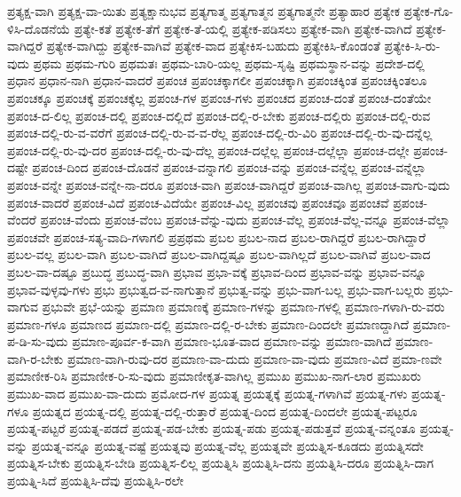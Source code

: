 {ಪ್ರತ್ಯಕ್ಷ-ವಾಗಿ
ಪ್ರತ್ಯಕ್ಷ-ವಾ-ಯಿತು
ಪ್ರತ್ಯಕ್ಷಾನುಭವ
ಪ್ರತ್ಯಗಾತ್ಮ
ಪ್ರತ್ಯಗಾತ್ಮನ
ಪ್ರತ್ಯಗಾತ್ಮನೇ
ಪ್ರತ್ಯಾಹಾರ
ಪ್ರತ್ಯೇಕ
ಪ್ರತ್ಯೇಕ-ಗೊ-ಳಿಸಿ-ದೊಡನೆಯೆ
ಪ್ರತ್ಯೇ-ಕತೆ
ಪ್ರತ್ಯೇಕ-ತೆಗೆ
ಪ್ರತ್ಯೇಕ-ತೆ-ಯಲ್ಲಿ
ಪ್ರತ್ಯೇಕ-ಪಡಿಸಲು
ಪ್ರತ್ಯೇಕ-ವಾಗಿ
ಪ್ರತ್ಯೇಕ-ವಾಗಿದೆ
ಪ್ರತ್ಯೇಕ-ವಾಗಿದ್ದರೆ
ಪ್ರತ್ಯೇಕ-ವಾಗಿದ್ದು
ಪ್ರತ್ಯೇಕ-ವಾಗಿವೆ
ಪ್ರತ್ಯೇಕ-ವಾದ
ಪ್ರತ್ಯೇಕಿಸ-ಬಹುದು
ಪ್ರತ್ಯೇಕಿಸಿ-ಕೊಂಡಂತೆ
ಪ್ರತ್ಯೇಕಿ-ಸಿ-ರು-ವುದು
ಪ್ರಥಮ
ಪ್ರಥಮ-ಗುರಿ
ಪ್ರಥಮತಃ
ಪ್ರಥಮ-ಬಾರಿ-ಯಲ್ಲ
ಪ್ರಥಮ-ಸೃಷ್ಟಿ
ಪ್ರಥಮಸ್ಥಾನ-ವನ್ನು
ಪ್ರದೇಶ-ದಲ್ಲಿ
ಪ್ರಧಾನ
ಪ್ರಧಾನ-ನಾಗಿ
ಪ್ರಧಾನ-ವಾದರೆ
ಪ್ರಪಂಚ
ಪ್ರಪಂಚಕ್ಕಾಗಲೀ
ಪ್ರಪಂಚಕ್ಕಾಗಿ
ಪ್ರಪಂಚಕ್ಕಿಂತ
ಪ್ರಪಂಚಕ್ಕಿಂತಲೂ
ಪ್ರಪಂಚಕ್ಕೂ
ಪ್ರಪಂಚಕ್ಕೆ
ಪ್ರಪಂಚಕ್ಕೆಲ್ಲ
ಪ್ರಪಂಚ-ಗಳ
ಪ್ರಪಂಚ-ಗಳು
ಪ್ರಪಂಚದ
ಪ್ರಪಂಚ-ದಂತೆ
ಪ್ರಪಂಚ-ದಂತೆಯೇ
ಪ್ರಪಂಚ-ದ-ಲಿಲ್ಲ
ಪ್ರಪಂಚ-ದಲ್ಲಿ
ಪ್ರಪಂಚ-ದಲ್ಲಿದೆ
ಪ್ರಪಂಚ-ದಲ್ಲಿ-ರ-ಬೇಕು
ಪ್ರಪಂಚ-ದಲ್ಲಿರು
ಪ್ರಪಂಚ-ದಲ್ಲಿ-ರುವ
ಪ್ರಪಂಚ-ದಲ್ಲಿ-ರು-ವ-ವರೆಗೆ
ಪ್ರಪಂಚ-ದಲ್ಲಿ-ರು-ವ-ವ-ರೆಲ್ಲ
ಪ್ರಪಂಚ-ದಲ್ಲಿ-ರು-ವಿರಿ
ಪ್ರಪಂಚ-ದಲ್ಲಿ-ರು-ವು-ದನ್ನೆಲ್ಲ
ಪ್ರಪಂಚ-ದಲ್ಲಿ-ರು-ವು-ದರ
ಪ್ರಪಂಚ-ದಲ್ಲಿ-ರು-ವು-ದೆಲ್ಲ
ಪ್ರಪಂಚ-ದಲ್ಲೆಲ್ಲ
ಪ್ರಪಂಚ-ದಲ್ಲೆಲ್ಲಾ
ಪ್ರಪಂಚ-ದಲ್ಲೇ
ಪ್ರಪಂಚ-ದಷ್ಟೇ
ಪ್ರಪಂಚ-ದಿಂದ
ಪ್ರಪಂಚ-ದೊಡನೆ
ಪ್ರಪಂಚ-ವನ್ನಾಗಲಿ
ಪ್ರಪಂಚ-ವನ್ನು
ಪ್ರಪಂಚ-ವನ್ನೆಲ್ಲ
ಪ್ರಪಂಚ-ವನ್ನೆಲ್ಲಾ
ಪ್ರಪಂಚ-ವನ್ನೇ
ಪ್ರಪಂಚ-ವನ್ನೇ-ನಾ-ದರೂ
ಪ್ರಪಂಚ-ವಾಗಿ
ಪ್ರಪಂಚ-ವಾಗಿದ್ದರೆ
ಪ್ರಪಂಚ-ವಾಗಿಲ್ಲ
ಪ್ರಪಂಚ-ವಾಗು-ವುದು
ಪ್ರಪಂಚ-ವಾದರೆ
ಪ್ರಪಂಚ-ವಿದೆ
ಪ್ರಪಂಚ-ವಿದೆಯೇ
ಪ್ರಪಂಚ-ವಿಲ್ಲ
ಪ್ರಪಂಚವು
ಪ್ರಪಂಚವೂ
ಪ್ರಪಂಚವೆ
ಪ್ರಪಂಚ-ವೆಂದರೆ
ಪ್ರಪಂಚ-ವೆಂದು
ಪ್ರಪಂಚ-ವೆಂಬ
ಪ್ರಪಂಚ-ವೆನ್ನು-ವುದು
ಪ್ರಪಂಚ-ವೆಲ್ಲ
ಪ್ರಪಂಚ-ವೆಲ್ಲ-ವನ್ನೂ
ಪ್ರಪಂಚ-ವೆಲ್ಲಾ
ಪ್ರಪಂಚವೇ
ಪ್ರಪಂಚ-ಸತ್ಯ-ವಾದಿ-ಗಳಾಗಲಿ
ಪ್ರಪ್ರಥಮ
ಪ್ರಬಲ
ಪ್ರಬಲ-ನಾದ
ಪ್ರಬಲ-ರಾಗಿದ್ದರೆ
ಪ್ರಬಲ-ರಾಗಿದ್ದಾರೆ
ಪ್ರಬಲ-ವಲ್ಲ
ಪ್ರಬಲ-ವಾಗಿ
ಪ್ರಬಲ-ವಾಗಿದೆ
ಪ್ರಬಲ-ವಾಗಿದ್ದಷ್ಟೂ
ಪ್ರಬಲ-ವಾಗಿಲ್ಲದೆ
ಪ್ರಬಲ-ವಾಗಿವೆ
ಪ್ರಬಲ-ವಾದ
ಪ್ರಬಲ-ವಾ-ದಷ್ಟೂ
ಪ್ರಬುದ್ಧ
ಪ್ರಬುದ್ಧ-ವಾಗಿ
ಪ್ರಭಾವ
ಪ್ರಭಾ-ವಕ್ಕೆ
ಪ್ರಭಾವ-ದಿಂದ
ಪ್ರಭಾವ-ವನ್ನು
ಪ್ರಭಾವ-ವನ್ನೂ
ಪ್ರಭಾವ-ವುಳ್ಳವು-ಗಳು
ಪ್ರಭು
ಪ್ರಭುತ್ವದ-ವ-ನಾಗುತ್ತಾನೆ
ಪ್ರಭುತ್ವ-ವನ್ನು
ಪ್ರಭು-ವಾಗ-ಬಲ್ಲ
ಪ್ರಭು-ವಾಗ-ಬಲ್ಲರು
ಪ್ರಭು-ವಾಗುವ
ಪ್ರಭುವೇ
ಪ್ರಭೆ-ಯನ್ನು
ಪ್ರಮಾಣ
ಪ್ರಮಾಣಕ್ಕೆ
ಪ್ರಮಾಣ-ಗಳನ್ನು
ಪ್ರಮಾಣ-ಗಳಲ್ಲಿ
ಪ್ರಮಾಣ-ಗಳಾಗಿ-ರು-ವರು
ಪ್ರಮಾಣ-ಗಳೂ
ಪ್ರಮಾಣದ
ಪ್ರಮಾಣ-ದಲ್ಲಿ
ಪ್ರಮಾಣ-ದಲ್ಲಿ-ರ-ಬೇಕು
ಪ್ರಮಾಣ-ದಿಂದಲೇ
ಪ್ರಮಾಣದ್ದಾಗಿದೆ
ಪ್ರಮಾಣ-ಪ-ಡಿ-ಸು-ವುದು
ಪ್ರಮಾಣ-ಪೂರ್ವ-ಕ-ವಾಗಿ
ಪ್ರಮಾಣ-ಭೂತ-ವಾದ
ಪ್ರಮಾಣ-ವನ್ನು
ಪ್ರಮಾಣ-ವಾಗಿದೆ
ಪ್ರಮಾಣ-ವಾಗಿ-ರ-ಬೇಕು
ಪ್ರಮಾಣ-ವಾಗಿ-ರುವು-ದರ
ಪ್ರಮಾಣ-ವಾ-ದುದು
ಪ್ರಮಾಣ-ವಾ-ವುದು
ಪ್ರಮಾಣ-ವಿದೆ
ಪ್ರಮಾ-ಣವೇ
ಪ್ರಮಾಣೀಕ-ರಿಸಿ
ಪ್ರಮಾಣೀಕ-ರಿ-ಸು-ವುದು
ಪ್ರಮಾಣೀಕೃತ-ವಾಗಿಲ್ಲ
ಪ್ರಮುಖ
ಪ್ರಮುಖ-ನಾಗ-ಲಾರ
ಪ್ರಮುಖರು
ಪ್ರಮುಖ-ವಾದ
ಪ್ರಮುಖ-ವಾ-ದುದು
ಪ್ರಮೋದ-ಗಳ
ಪ್ರಯತ್ನ
ಪ್ರಯತ್ನಕ್ಕೆ
ಪ್ರಯತ್ನ-ಗಳಾಗಿವೆ
ಪ್ರಯತ್ನ-ಗಳು
ಪ್ರಯತ್ನ-ಗಳೂ
ಪ್ರಯತ್ನದ
ಪ್ರಯತ್ನ-ದಲ್ಲಿ
ಪ್ರಯತ್ನ-ದಲ್ಲಿ-ರುತ್ತಾರೆ
ಪ್ರಯತ್ನ-ದಿಂದ
ಪ್ರಯತ್ನ-ದಿಂದಲೇ
ಪ್ರಯತ್ನ-ಪಟ್ಟರೂ
ಪ್ರಯತ್ನ-ಪಟ್ಟರೆ
ಪ್ರಯತ್ನ-ಪಡದೆ
ಪ್ರಯತ್ನ-ಪಡ-ಬೇಕು
ಪ್ರಯತ್ನ-ಪಡು
ಪ್ರಯತ್ನ-ಪಡುತ್ತವೆ
ಪ್ರಯತ್ನ-ವನ್ನಂತೂ
ಪ್ರಯತ್ನ-ವನ್ನು
ಪ್ರಯತ್ನ-ವನ್ನೂ
ಪ್ರಯತ್ನ-ವಷ್ಟೆ
ಪ್ರಯತ್ನವು
ಪ್ರಯತ್ನ-ವೆಲ್ಲ
ಪ್ರಯತ್ನವೇ
ಪ್ರಯತ್ನಿಸ-ಕೂಡದು
ಪ್ರಯತ್ನಿಸದೇ
ಪ್ರಯತ್ನಿಸ-ಬೇಕು
ಪ್ರಯತ್ನಿಸ-ಬೇಡಿ
ಪ್ರಯತ್ನಿಸ-ಲಿಲ್ಲ
ಪ್ರಯತ್ನಿಸಿ
ಪ್ರಯತ್ನಿಸಿ-ದನು
ಪ್ರಯತ್ನಿಸಿ-ದರೂ
ಪ್ರಯತ್ನಿಸಿ-ದಾಗ
ಪ್ರಯತ್ನಿ-ಸಿದೆ
ಪ್ರಯತ್ನಿಸಿ-ದೆವು
ಪ್ರಯತ್ನಿಸಿ-ರಲೇ
}
